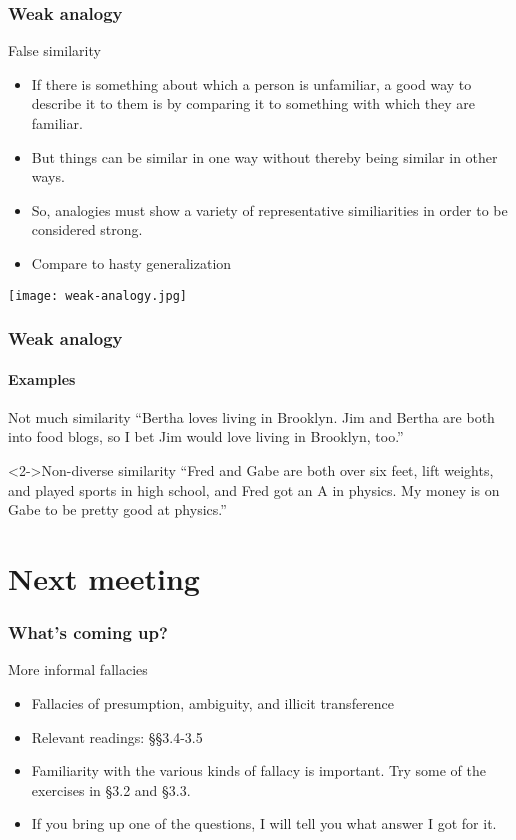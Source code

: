 \documentclass[10pt,letterpaper,xcolor=dvipsnames]{beamer}
\begin{document}
\begin{frame}
  \frametitle{Weak analogy}
  
  \begin{block}{False similarity}
    \begin{itemize}
      \item If there is something about which a person is unfamiliar, a good way to describe it to them is by comparing it to something with which they are familiar.
      \item But things can be similar in one way without thereby being similar in other ways.
      \item So, analogies must show a variety of representative similiarities in order to be considered strong.
      \item Compare to hasty generalization
    \end{itemize}
  \end{block}
  
    \begin{center}
    \texttt{[image: weak-analogy.jpg]}
  \end{center}
  
\end{frame}

\begin{frame}
  \frametitle{Weak analogy}
  \framesubtitle{Examples}
  
  \begin{block}{Not much similarity}
    ``Bertha loves living in Brooklyn.  Jim and Bertha are both into food blogs, so I bet Jim would love living in Brooklyn, too.''
  \end{block}
  
  \begin{block}<2->{Non-diverse similarity}
    ``Fred and Gabe are both over six feet, lift weights, and played sports in high school, and Fred got an A in physics.  My money is on Gabe to be pretty good at physics.''
  \end{block}
  
\end{frame}

\section{Next meeting}

\begin{frame}
  \frametitle{What's coming up?}

  \begin{block}{More informal fallacies}
    \begin{itemize}
      \item Fallacies of presumption, ambiguity, and illicit transference
      \item Relevant readings: \S\S 3.4-3.5
      \item Familiarity with the various kinds of fallacy is important.  Try some of the exercises in \S3.2 and \S3.3.
      \item If you bring up one of the questions, I will tell you what answer I got for it.
    \end{itemize}
  \end{block}
  
\end{frame}
\end{document}
